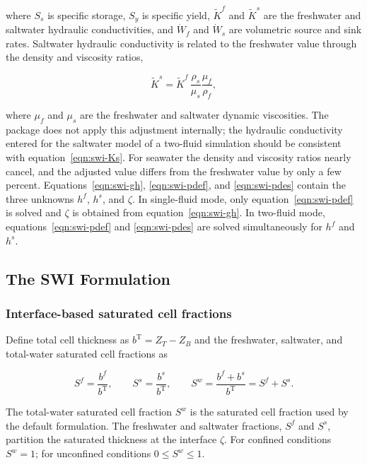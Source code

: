 \noindent where $S_{s}$ is specific storage, $S_{y}$ is specific yield, $\tilde K^{f}$ and $\tilde K^{s}$ are the freshwater and saltwater hydraulic conductivities, and $\dot W_{f}$ and $\dot W_{s}$ are volumetric source and sink rates. Saltwater hydraulic conductivity is related to the freshwater value through the density and viscosity ratios,

\begin{equation}
\label{eqn:swi-Ks}
\tilde K^{s}=\tilde K^{f}\,\frac{\rho_{s}}{\mu_{s}}\frac{\mu_{f}}{\rho_{f}},
\end{equation}

\noindent where $\mu_{f}$ and $\mu_{s}$ are the freshwater and saltwater dynamic viscosities. The package does not apply this adjustment internally; the hydraulic conductivity entered for the saltwater model of a two-fluid simulation should be consistent with equation~\ref{eqn:swi-Ks}. For seawater the density and viscosity ratios nearly cancel, and the adjusted value differs from the freshwater value by only a few percent. Equations~\ref{eqn:swi-gh}, \ref{eqn:swi-pdef}, and \ref{eqn:swi-pdes} contain the three unknowns $h^{f}$, $h^{s}$, and $\zeta$. In single-fluid mode, only equation~\ref{eqn:swi-pdef} is solved and $\zeta$ is obtained from equation~\ref{eqn:swi-gh}. In two-fluid mode, equations~\ref{eqn:swi-pdef} and \ref{eqn:swi-pdes} are solved simultaneously for $h^{f}$ and $h^{s}$.

\subsection{The SWI Formulation}
\label{sec:swi-formulation}

\subsubsection{Interface-based saturated cell fractions}

Define total cell thickness as $b^{\mathrm{T}}=Z_{T}-Z_{B}$ and the freshwater, saltwater, and total-water saturated cell fractions as

\begin{equation}
\label{eqn:swi-sats}
S^{f}=\frac{b^{f}}{b^{\mathrm{T}}},\qquad
S^{s}=\frac{b^{s}}{b^{\mathrm{T}}},\qquad
S^{w}=\frac{b^{f}+b^{s}}{b^{\mathrm{T}}}=S^{f}+S^{s}.
\end{equation}

\noindent The total-water saturated cell fraction $S^{w}$ is the saturated cell fraction used by the default \mf formulation. The freshwater and saltwater fractions, $S^{f}$ and $S^{s}$, partition the saturated thickness at the interface $\zeta$. For confined conditions $S^{w}=1$; for unconfined conditions $0\le S^{w}\le 1$.

